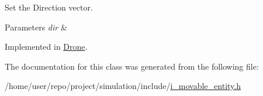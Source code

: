 Set the Direction vector. 


\begin{DoxyParams}{Parameters}
{\em dir} & \\
\hline
\end{DoxyParams}


Implemented in \hyperlink{classDrone_a2ef1fbc3da17a8d599d2969990eb9614}{Drone}.



The documentation for this class was generated from the following file\+:\begin{DoxyCompactItemize}
\item 
/home/user/repo/project/simulation/include/\hyperlink{i__movable__entity_8h}{i\+\_\+movable\+\_\+entity.\+h}\end{DoxyCompactItemize}
